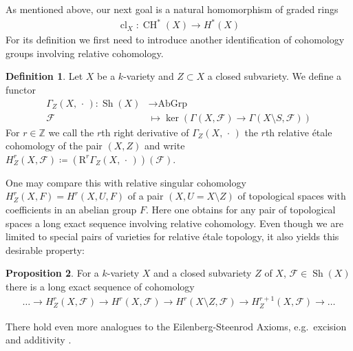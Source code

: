 \documentclass[english]{scrartcl}
\theoremstyle{definition}
\newtheorem{Def}{Definition}[section]
\newtheorem{Prop}[Def]{Proposition}
\theoremstyle{remark}
\newcommand*{\Z}{\mathds{Z}}
\newcommand*{\F}{\mathcal{F}} %
\DeclareMathOperator{\Sh}{Sh} %
\newcommand*{\forexample}{e.g.\ }
\newcommand*{\argreplacement}{\,\cdot\,} %
\DeclareMathOperator{\CH}{CH} %
\DeclareMathOperator{\CL}{cl} %
\begin{document}
As mentioned above, our next goal is a natural homomorphism of graded rings
\begin{gather*}
  \CL_X\colon \CH^*(X)\rightarrow H^*(X)
\end{gather*}
For its definition we first need to introduce another identification
of cohomology groups involving relative cohomology.

\begin{Def}\label{def:relcoh}
  Let $X$ be a $k$-variety and $Z\subset X$ a closed subvariety.
  We define a functor
  \begin{align*}
    \Gamma_Z(X,\argreplacement) \colon \Sh(X) &\rightarrow \text{AbGrp}\\
    \F &\longmapsto \ker\left(\Gamma(X,\F)\to \Gamma(X\setminus S,\F)\right)
  \end{align*}
  For $r\in\Z$ we call the $r$th right derivative of
  $\Gamma_Z(X,\argreplacement)$ the $r$th relative étale cohomology of the pair
  $(X,Z)$ and write
  $H_Z^r(X,\F)\coloneqq\left(\mathrm R^r\Gamma_Z(X,\argreplacement)\right)(\F)$.
\end{Def}
One may compare this with relative singular cohomology $H_Z^r(X,F)=H^r(X,U,F)$
of a pair $(X,U=X\setminus Z)$ of topological spaces with coefficients
in an abelian group $F$. Here one obtains for any pair of topological
spaces a long exact sequence involving relative cohomology.
Even though we are limited to special pairs of varieties for relative
étale topology, it also yields this desirable property:
\begin{Prop}\label{lesrelcoh}
  For a $k$-variety $X$ and a closed subvariety $Z$ of $X$,
  $\F\in\Sh(X)$ there is a long exact sequence of cohomology
  \begin{gather*}
    \dotsc
    \to H_Z^r(X,\F)
    \to H^r(X,\F)
    \to H^r(X\setminus Z,\F)
    \to H_Z^{r+1}(X,\F)
    \to \dotsc
  \end{gather*}
\end{Prop}
There hold even more analogues to the Eilenberg-Steenrod Axioms,
\forexample excision and additivity \cite[compare][Chap.~9]{milne}.
\end{document}
